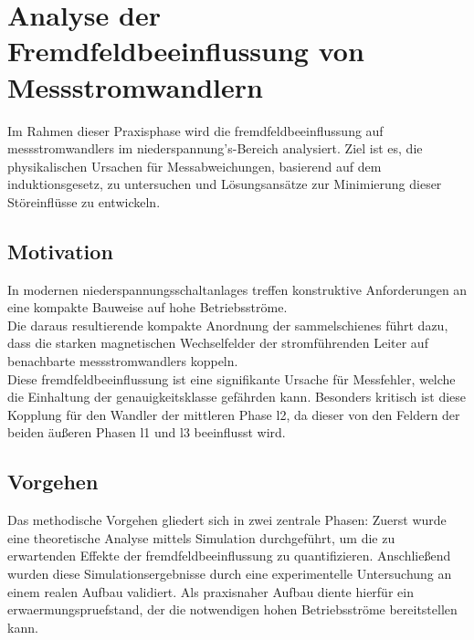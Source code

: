 
\section{Analyse der Fremdfeldbeeinflussung von Messstromwandlern}
\label{chap:projektbericht}

Im Rahmen dieser Praxisphase wird die \gls{fremdfeld}beeinflussung auf \glspl{messstromwandler} im \gls{niederspannung}'s-Bereich analysiert. Ziel ist es, die physikalischen Ursachen für Messabweichungen, basierend auf dem \gls{induktionsgesetz}, zu untersuchen und Lösungsansätze zur Minimierung dieser Störeinflüsse zu entwickeln.

\subsection{Motivation}
\label{sec:motivation}
In modernen \Glspl{niederspannungsschaltanlage} treffen konstruktive Anforderungen an eine kompakte Bauweise auf hohe Betriebsströme.\\
Die daraus resultierende kompakte Anordnung der \glspl{sammelschiene} führt dazu, dass die starken magnetischen Wechselfelder der stromführenden Leiter auf benachbarte \glspl{messstromwandler} koppeln.\\
Diese \gls{fremdfeld}beeinflussung ist eine signifikante Ursache für Messfehler, welche die Einhaltung der \gls{genauigkeitsklasse} gefährden kann. Besonders kritisch ist diese Kopplung für den Wandler der mittleren Phase \acrshort{l2}, da dieser von den Feldern der beiden äußeren Phasen \acrshort{l1} und \acrshort{l3} beeinflusst wird.



\subsection{Vorgehen}
\label{sec:vorgehen}
Das methodische Vorgehen gliedert sich in zwei zentrale Phasen: Zuerst wurde eine theoretische Analyse mittels Simulation durchgeführt, um die zu erwartenden Effekte der \gls{fremdfeld}beeinflussung zu quantifizieren. Anschließend wurden diese Simulationsergebnisse durch eine experimentelle Untersuchung an einem realen Aufbau validiert. Als praxisnaher Aufbau diente hierfür ein \gls{erwaermungspruefstand}, der die notwendigen hohen Betriebsströme bereitstellen kann.

